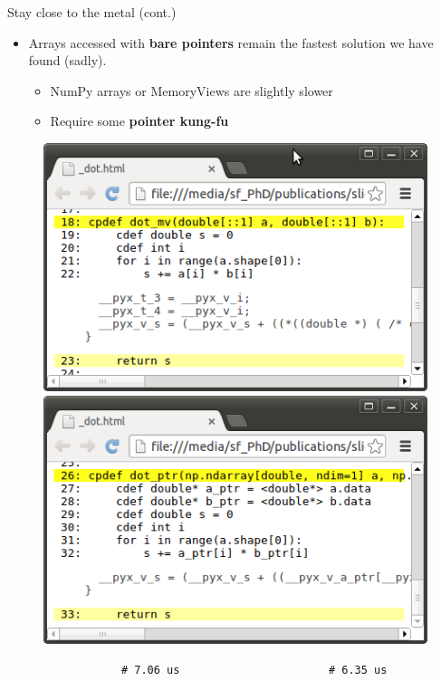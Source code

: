\documentclass{beamer}
\begin{document}
\begin{frame}[fragile]{Stay close to the metal (cont.)}
\begin{itemize}
\item Arrays accessed with {\bf bare pointers} remain the fastest solution we have found (sadly).
  \begin{itemize}
    \item NumPy arrays or MemoryViews are slightly slower
    \item Require some {\bf \color{red} pointer kung-fu}
  \end{itemize}
\end{itemize}
  \begin{figure}
  \includegraphics[scale=0.33]{./figures/1.png}\quad
  \includegraphics[scale=0.33]{./figures/2.png}\\
  \begin{verbatim}
            # 7.06 us                       # 6.35 us
  \end{verbatim}
  \end{figure}
\end{frame}
\end{document}
